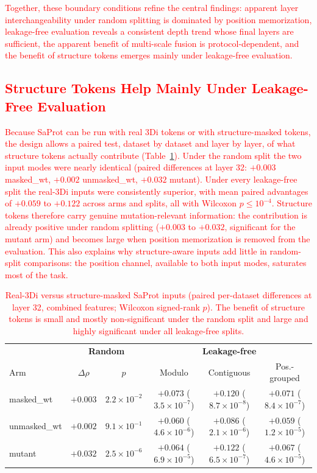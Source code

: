 \documentclass[numbered,webpdf,modern,large]{oup-authoring-template}
\newcommand{\rev}[1]{\textcolor{red}{#1}}
\begin{document}
\rev{Together, these boundary conditions refine the central findings: apparent
layer interchangeability under random splitting is dominated by position
memorization, leakage-free evaluation reveals a consistent depth trend whose
final layers are sufficient, the apparent benefit of multi-scale fusion is
protocol-dependent, and the benefit of structure tokens emerges mainly under
leakage-free evaluation.}

\subsection{\rev{Structure Tokens Help Mainly Under Leakage-Free Evaluation}}

\rev{Because SaProt can be run with real 3Di tokens or with structure-masked
tokens, the design allows a paired test, dataset by dataset and layer by
layer, of what structure tokens actually contribute (Table~\ref{tab:3di}). Under the
random split the two input modes were nearly identical (paired differences at layer
32: $+0.003$ masked\_wt, $+0.002$ unmasked\_wt, $+0.032$ mutant). Under every
leakage-free split the real-3Di inputs were consistently superior, with mean paired
advantages of $+0.059$ to $+0.122$ across arms and splits, all with Wilcoxon
$p \leq 10^{-4}$. Structure tokens therefore carry genuine mutation-relevant
information: the contribution is already positive under random splitting
($+0.003$ to $+0.032$, significant for the mutant arm) and becomes large when
position memorization is removed from the evaluation. This also
explains why structure-aware inputs add little in random-split comparisons:
the position channel, available to both input modes, saturates most of the
task.}

\begin{table}[ht]
\centering
\caption{\rev{Real-3Di versus structure-masked SaProt inputs (paired per-dataset
differences at layer 32, combined features; Wilcoxon signed-rank $p$). The benefit of
structure tokens is small and mostly non-significant under the random split and
large and highly significant under all leakage-free splits.}}
\label{tab:3di}
\begin{tabular}{lcc|ccc}
\toprule
& \multicolumn{2}{c|}{\textbf{Random}} & \multicolumn{3}{c}{\textbf{Leakage-free}} \\
Arm & $\Delta\rho$ & $p$ & Modulo & Contiguous & Pos.-grouped \\
\midrule
masked\_wt   & $+0.003$ & $2.2 \times 10^{-2}$ & $+0.073$ ($3.5 \times 10^{-7}$) & $+0.120$ ($8.7 \times 10^{-8}$) & $+0.071$ ($8.4 \times 10^{-7}$) \\
unmasked\_wt & $+0.002$ & $9.1 \times 10^{-1}$ & $+0.060$ ($4.6 \times 10^{-6}$) & $+0.086$ ($2.1 \times 10^{-6}$) & $+0.059$ ($1.2 \times 10^{-5}$) \\
mutant       & $+0.032$ & $2.5 \times 10^{-6}$ & $+0.064$ ($6.9 \times 10^{-5}$) & $+0.122$ ($6.5 \times 10^{-7}$) & $+0.067$ ($4.6 \times 10^{-5}$) \\
\bottomrule
\end{tabular}
\end{table}
\end{document}
